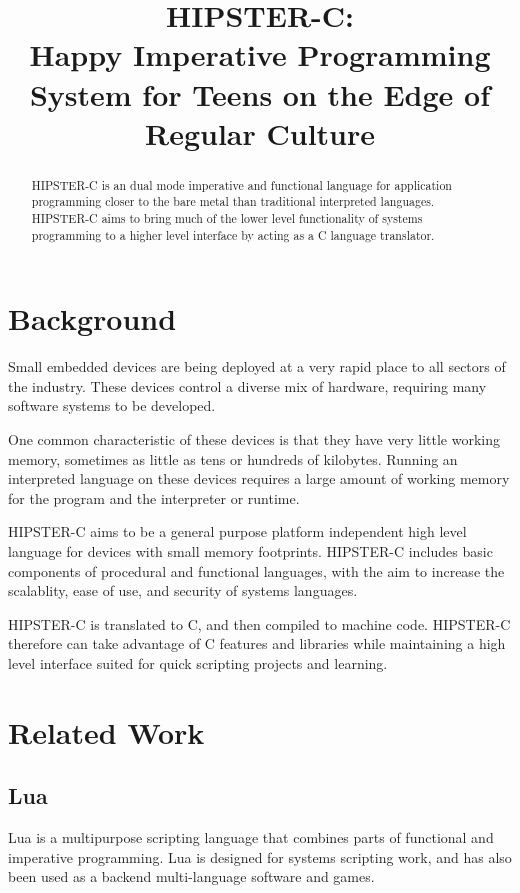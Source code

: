 \documentclass{article}
\title{HIPSTER-C:\\
       Happy Imperative Programming System for Teens on the Edge of Regular Culture}
\begin{document}
\maketitle


\begin{abstract}
  HIPSTER-C is an dual mode imperative and functional language for application programming closer to the bare metal than traditional interpreted languages. HIPSTER-C aims to bring much of the lower level functionality of systems programming to a higher level interface by acting as a C language translator.
\end{abstract} 




\section{Background}
Small embedded devices are being deployed at a very rapid place to all sectors of the industry. These devices control a diverse mix of hardware, requiring many software systems to be developed. \par
One common characteristic of these devices is that they have very little working memory, sometimes as little as tens or hundreds of kilobytes. Running an interpreted language on these devices requires a large amount of working memory for the program and the interpreter or runtime. \par
HIPSTER-C aims to be a general purpose platform independent high level language for devices with small memory footprints. HIPSTER-C includes basic components of procedural and functional languages, with the aim to increase the scalablity, ease of use, and security of systems languages. \par 
HIPSTER-C is translated to C, and then compiled to machine code. HIPSTER-C therefore can take advantage of C features and libraries while maintaining a high level interface suited for quick scripting projects and learning. 

\section{Related Work}
\subsection{Lua}
Lua is a multipurpose scripting language that combines parts of functional and imperative programming. Lua is designed for systems scripting work, and has also been used as a backend multi-language software and games. 
\end{document}
